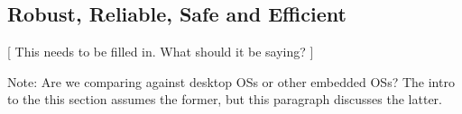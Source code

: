 \subsection{Robust, Reliable, Safe and Efficient}


[ This needs to be filled in. What should it be saying? ]

Note: Are we comparing against desktop OSs or other embedded OSs? The intro
to the this section assumes the former, but this paragraph discusses the
latter.










